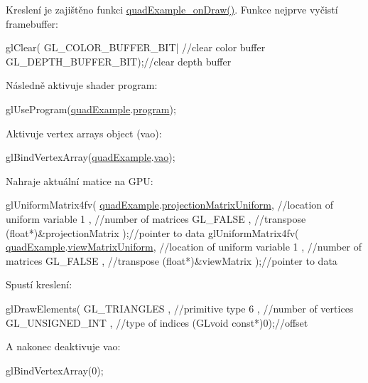 Kreslení je zajištěno funkci \hyperlink{quadExample_8c_a357ede357c44b3a5a41681591a1108c8}{quad\-Example\-\_\-on\-Draw()}. Funkce nejprve vyčistí framebuffer\-: 
\begin{DoxyCodeInclude}
  glClear(
      GL\_COLOR\_BUFFER\_BIT| \textcolor{comment}{//clear color buffer}
      GL\_DEPTH\_BUFFER\_BIT);\textcolor{comment}{//clear depth buffer}
\end{DoxyCodeInclude}
Následně aktivuje shader program\-: 
\begin{DoxyCodeInclude}
  glUseProgram(\hyperlink{quadExample_8c_ad961415145a9c30bd9846d4a278cc63a}{quadExample}.\hyperlink{structQuadExampleVariables_a63971781ff860bd201886926f943ba78}{program});
\end{DoxyCodeInclude}
Aktivuje vertex arrays object (vao)\-: 
\begin{DoxyCodeInclude}
  glBindVertexArray(\hyperlink{quadExample_8c_ad961415145a9c30bd9846d4a278cc63a}{quadExample}.\hyperlink{structQuadExampleVariables_a294c388653d62435d7eeb7994f45c4fc}{vao});
\end{DoxyCodeInclude}
Nahraje aktuální matice na G\-P\-U\-: 
\begin{DoxyCodeInclude}
  glUniformMatrix4fv(
      \hyperlink{quadExample_8c_ad961415145a9c30bd9846d4a278cc63a}{quadExample}.\hyperlink{structQuadExampleVariables_a38a1023cb8ee3692e195ea574e43c51a}{projectionMatrixUniform}, \textcolor{comment}{//location of uniform variable}
      1                                  , \textcolor{comment}{//number of matrices}
      GL\_FALSE                           , \textcolor{comment}{//transpose}
      (\textcolor{keywordtype}{float}*)&projectionMatrix          );\textcolor{comment}{//pointer to data}
  glUniformMatrix4fv(
      \hyperlink{quadExample_8c_ad961415145a9c30bd9846d4a278cc63a}{quadExample}.\hyperlink{structQuadExampleVariables_a9c505e0a089ecd495b18550309ebab77}{viewMatrixUniform}, \textcolor{comment}{//location of uniform variable}
      1                            , \textcolor{comment}{//number of matrices}
      GL\_FALSE                     , \textcolor{comment}{//transpose}
      (\textcolor{keywordtype}{float}*)&viewMatrix          );\textcolor{comment}{//pointer to data}
\end{DoxyCodeInclude}
Spustí kreslení\-: 
\begin{DoxyCodeInclude}
  glDrawElements(
      GL\_TRIANGLES    , \textcolor{comment}{//primitive type}
      6               , \textcolor{comment}{//number of vertices}
      GL\_UNSIGNED\_INT , \textcolor{comment}{//type of indices}
      (GLvoid \textcolor{keyword}{const}*)0);\textcolor{comment}{//offset}
\end{DoxyCodeInclude}
A nakonec deaktivuje vao\-: 
\begin{DoxyCodeInclude}
  glBindVertexArray(0);
\end{DoxyCodeInclude}
 
\begin{DoxyCodeInclude}
\end{DoxyCodeInclude}
 
